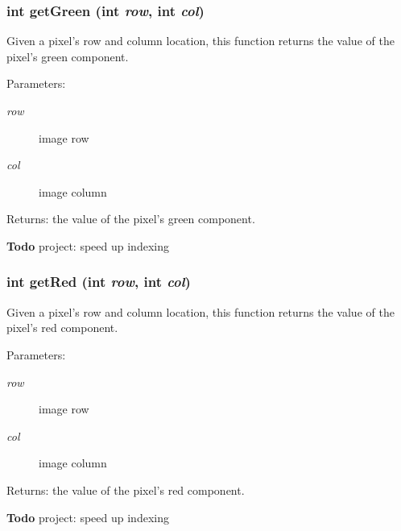 \subsubsection{\setlength{\rightskip}{0pt plus 5cm}int get\-Green (int {\em row}, int {\em col})}\label{class_c_s_image_viewer_1_1_color_image_data_eb04f53da669ba68d0ddd2dfc0ce9f9e}


Given a pixel's row and column location, this function returns the value of the pixel's green component. 

\begin{Desc}
\item[Parameters:]
\begin{description}
\item[{\em row}]image row \item[{\em col}]image column \end{description}
\end{Desc}
\begin{Desc}
\item[Returns:]the value of the pixel's green component.\end{Desc}
\begin{Desc}
\item[{\bf Todo}]project: speed up indexing \end{Desc}
\subsubsection{\setlength{\rightskip}{0pt plus 5cm}int get\-Red (int {\em row}, int {\em col})}\label{class_c_s_image_viewer_1_1_color_image_data_3c7179eb0903415f89e40451632deca4}


Given a pixel's row and column location, this function returns the value of the pixel's red component. 

\begin{Desc}
\item[Parameters:]
\begin{description}
\item[{\em row}]image row \item[{\em col}]image column \end{description}
\end{Desc}
\begin{Desc}
\item[Returns:]the value of the pixel's red component.\end{Desc}
\begin{Desc}
\item[{\bf Todo}]project: speed up indexing \end{Desc}
